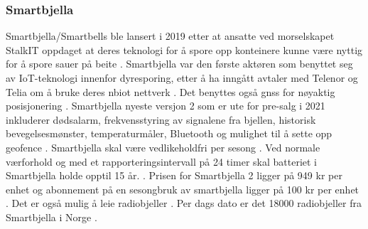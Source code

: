 \subsubsection{Smartbjella}
Smartbjella/Smartbells ble lansert i 2019 etter at ansatte ved morselskapet StalkIT \cite{HomeStalkITNo} oppdaget at deres teknologi for å spore opp konteinere kunne være nyttig for å spore sauer på beite \cite{SMARTBELLSEmisjonskampanjeFolkeinvest2019}. Smartbjella var den første aktøren som benyttet seg av IoT-teknologi innenfor dyresporing, etter å ha inngått avtaler med Telenor og Telia om å bruke deres \acrshort{nbiot} nettverk  \cite{henriksenKonkurransenBeitetechHardner2020}. Det benyttes også \acrshort{gnss} for nøyaktig posisjonering \cite{PRODUKTSmartbjellaSporing}.  Smartbjella nyeste versjon 2 som er ute for pre-salg i 2021 inkluderer dødsalarm, frekvensstyring av signalene fra bjellen, historisk bevegelsesmønster, temperaturmåler, Bluetooth og mulighet til å sette opp geofence \cite{PRODUKTSmartbjellaSporing}. Smartbjella skal være vedlikeholdfri per sesong \cite{PRODUKTSmartbjellaSporing}. Ved normale værforhold og med et rapporteringsintervall på 24 timer skal batteriet i Smartbjella holde opptil 15 år. \cite{PRODUKTSmartbjellaSporing}. Prisen for Smartbjella 2 ligger på 949 kr per enhet og abonnement på en sesongbruk av smartbjella ligger på 100 kr per enhet \cite{SmartbjellaPresalg2021}. Det er også mulig å leie radiobjeller \cite{SMARTBELLSEmisjonskampanjeFolkeinvest2019}. Per dags dato er det 18000 radiobjeller fra Smartbjella i Norge \cite{SmartbjellaSporing}. 

